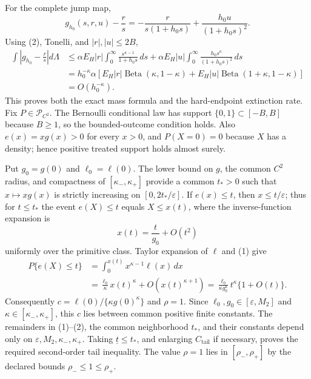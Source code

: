 For the complete jump map,
\[
 g_{h_0}(s,r,u)-\frac rs
 =-\frac{r}{s(1+h_0s)}+\frac{h_0u}{(1+h_0s)^2}. \tag{2}
\]
Using (2), Tonelli, and \(|r|,|u|\leq2B\),
\[
\begin{split}
 \int\left|g_{h_0}-\frac rs\right|d\Lambda
 &\leq \alpha E_H|r|\int_0^\infty\frac{s^{\kappa-1}}{1+h_0s}\,ds
 +\alpha E_H|u|\int_0^\infty\frac{h_0s^\kappa}{(1+h_0s)^2}\,ds\\
 &=h_0^{-\kappa}\alpha\!\left[
 E_H|r|\operatorname{Beta}(\kappa,1-\kappa)
 +E_H|u|\operatorname{Beta}(1+\kappa,1-\kappa)
 \right]\\
 &=O(h_0^{-\kappa}).
\end{split}
\]
This proves both the exact mass formula and the hard-endpoint extinction rate.
Fix \(P\in\mathcal P_{C^2}\).  The Bernoulli conditional law has support \(\{0,1\}\subset[-B,B]\) because \(B\geq1\), so the bounded-outcome condition holds.  Also \(e(x)=xg(x)>0\) for every \(x>0\), and \(P(X=0)=0\) because \(X\) has a density; hence positive treated support holds almost surely.

Put \(g_0=g(0)\) and \(\ell_0=\ell(0)\).  The lower bound on \(g\), the common \(C^2\) radius, and compactness of \([\kappa_-,\kappa_+]\) provide a common \(t_*>0\) such that \(x\mapsto xg(x)\) is strictly increasing on \([0,2t_*/\varepsilon]\).  If \(e(x)\leq t\), then \(x\leq t/\varepsilon\); thus for \(t\leq t_*\) the event \(e(X)\leq t\) equals \(X\leq x(t)\), where the inverse-function expansion is
\[
 x(t)=\frac{t}{g_0}+O(t^2) \tag{1}
\]
uniformly over the primitive class.  Taylor expansion of \(\ell\) and (1) give
\[
\begin{split}
 P\{e(X)\leq t\}
 &=\int_0^{x(t)}x^{\kappa-1}\ell(x)\,dx\\
 &=\frac{\ell_0}{\kappa}x(t)^\kappa+O(x(t)^{\kappa+1})
 =\frac{\ell_0}{\kappa g_0^\kappa}t^\kappa\{1+O(t)\}.
\end{split} \tag{2}
\]
Consequently \(c=\ell(0)/\{\kappa g(0)^\kappa\}\) and \(\rho=1\).  Since \(\ell_0,g_0\in[\varepsilon,M_2]\) and \(\kappa\in[\kappa_-,\kappa_+]\), this \(c\) lies between common positive finite constants.  The remainders in (1)--(2), the common neighborhood \(t_*\), and their constants depend only on \(\varepsilon,M_2,\kappa_-,\kappa_+\).  Taking \(\underline t\leq t_*\), and enlarging \(C_{\mathrm{tail}}\) if necessary, proves the required second-order tail inequality.  The value \(\rho=1\) lies in \([\rho_-,\rho_+]\) by the declared bounds \(\rho_-\leq1\leq\rho_+\).

